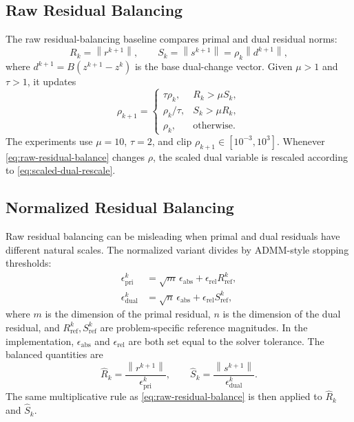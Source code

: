 \documentclass[11pt]{article}
\newcommand{\norm}[1]{\left\lVert #1 \right\rVert}
\begin{document}
\subsection{Raw Residual Balancing}

The raw residual-balancing baseline compares primal and dual residual norms:
\begin{equation}
    R_k=\norm{r^{k+1}},
    \qquad
    S_k=\norm{s^{k+1}}=\rho_k\norm{d^{k+1}},
\end{equation}
where $d^{k+1}=B(z^{k+1}-z^k)$ is the base dual-change vector.  Given
$\mu>1$ and $\tau>1$, it updates
\begin{equation}
    \rho_{k+1}
    =
    \begin{cases}
        \tau\rho_k, & R_k>\mu S_k,\\
        \rho_k/\tau, & S_k>\mu R_k,\\
        \rho_k, & \text{otherwise}.
    \end{cases}
    \label{eq:raw-residual-balance}
\end{equation}
The experiments use $\mu=10$, $\tau=2$, and clip
$\rho_{k+1}\in[10^{-3},10^3]$.  Whenever \eqref{eq:raw-residual-balance}
changes $\rho$, the scaled dual variable is rescaled according to
\eqref{eq:scaled-dual-rescale}.

\subsection{Normalized Residual Balancing}

Raw residual balancing can be misleading when primal and dual residuals have
different natural scales.  The normalized variant divides by ADMM-style
stopping thresholds:
\begin{align}
    \epsilon_{\mathrm{pri}}^k
    &=
    \sqrt{m}\,\epsilon_{\mathrm{abs}}
    +
    \epsilon_{\mathrm{rel}} R_{\mathrm{ref}}^k,\\
    \epsilon_{\mathrm{dual}}^k
    &=
    \sqrt{n}\,\epsilon_{\mathrm{abs}}
    +
    \epsilon_{\mathrm{rel}} S_{\mathrm{ref}}^k,
\end{align}
where $m$ is the dimension of the primal residual, $n$ is the dimension of the
dual residual, and $R_{\mathrm{ref}}^k,S_{\mathrm{ref}}^k$ are problem-specific
reference magnitudes.  In the implementation, $\epsilon_{\mathrm{abs}}$ and
$\epsilon_{\mathrm{rel}}$ are both set equal to the solver tolerance.  The
balanced quantities are
\begin{equation}
    \widehat{R}_k=\frac{\norm{r^{k+1}}}{\epsilon_{\mathrm{pri}}^k},
    \qquad
    \widehat{S}_k=\frac{\norm{s^{k+1}}}{\epsilon_{\mathrm{dual}}^k}.
\end{equation}
The same multiplicative rule as \eqref{eq:raw-residual-balance} is then applied
to $\widehat{R}_k$ and $\widehat{S}_k$.
\end{document}
